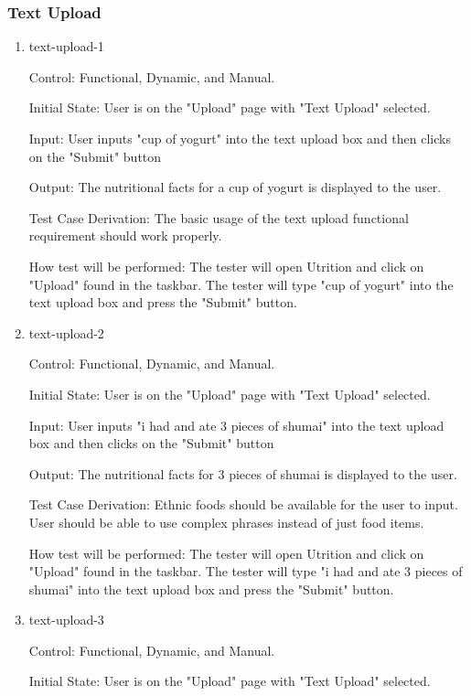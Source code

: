 \documentclass[12pt, titlepage]{article}
\begin{document}
	\subsubsection{Text Upload}
	\begin{enumerate}
	\item{text-upload-1\\}
	
	Control: Functional, Dynamic, and Manual.
	
	Initial State: User is on the "Upload" page with "Text Upload" selected.
	
	Input: User inputs "cup of yogurt" into the text upload box and then clicks on the "Submit" button
	
	Output: The nutritional facts for a cup of yogurt is displayed to the user.
	
	Test Case Derivation: The basic usage of the text upload functional requirement should work properly.
	
	How test will be performed: The tester will open Utrition and click on "Upload" found in the taskbar. The tester will type "cup of yogurt" into the text upload box and press the "Submit" button.
	
	\item{text-upload-2\\}
	
	Control: Functional, Dynamic, and Manual.
	
	Initial State: User is on the "Upload" page with "Text Upload" selected.
	
	Input: User inputs "i had and ate 3 pieces of shumai" into the text upload box and then clicks on the "Submit" button
	
	Output: The nutritional facts for 3 pieces of shumai is displayed to the user.
	
	Test Case Derivation: Ethnic foods should be available for the user to input. User should be able to use complex phrases instead of just food items.
	
	How test will be performed: The tester will open Utrition and click on "Upload" found in the taskbar. The tester will type "i had and ate 3 pieces of shumai" into the text upload box and press the "Submit" button.
	
	\item{text-upload-3\\}
	
	Control: Functional, Dynamic, and Manual.
	
	Initial State: User is on the "Upload" page with "Text Upload" selected.
	

\end{enumerate}
\end{document}
